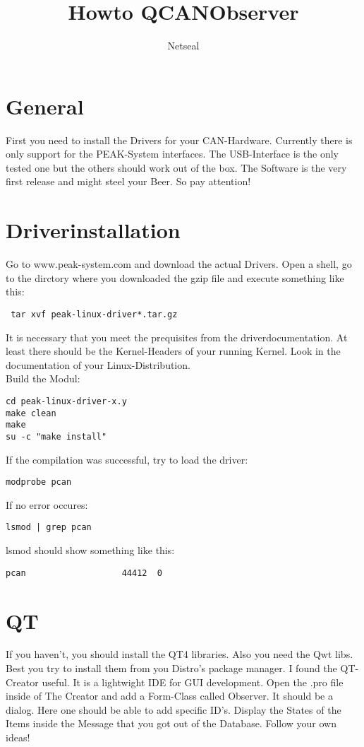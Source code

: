 \documentclass[a4paper,10pt]{article}
\title{Howto QCANObserver}
\author{Netseal}
\begin{document}
\maketitle
\section{General}
First you need to install the Drivers for your CAN-Hardware. Currently there is only support for the PEAK-System interfaces. The USB-Interface is the only tested one but the others should work out of the box. The Software is the very first release and might steel your Beer. So pay attention!


\section{Driverinstallation}
Go to www.peak-system.com and download the actual Drivers.
Open a shell, go to the dirctory where you downloaded the gzip file and execute something like this:
\begin{verbatim}
 tar xvf peak-linux-driver*.tar.gz
\end{verbatim} 
It is necessary that you meet the prequisites from the driverdocumentation.
At least there should be the Kernel-Headers of your running Kernel. Look in the documentation of your Linux-Distribution.\\
Build the Modul:
\begin{verbatim}
cd peak-linux-driver-x.y
make clean
make
su -c "make install"
\end{verbatim} 
If the compilation was successful, try to load the driver:

\begin{verbatim}
modprobe pcan
\end{verbatim} 
If no error occures:

\begin{verbatim}
lsmod | grep pcan
\end{verbatim} 
lsmod should show something like this:

\begin{verbatim}
pcan                   44412  0
\end{verbatim} 

\section{QT}
If you haven't, you should install the QT4 libraries. Also you need the Qwt libs. Best you try to install them from you Distro's package manager.
I found the QT-Creator useful. It is a lightwight IDE for GUI development.
Open the .pro file inside of The Creator and add a Form-Class called Observer. It should be a dialog. 
Here one should be able to add specific ID's. Display the States of the Items inside the Message that you got out of the Database.
Follow your own ideas!
\end{document}
